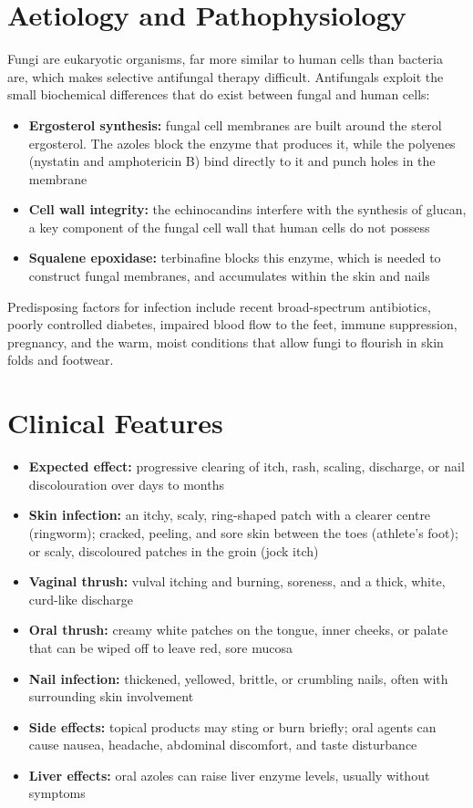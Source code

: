 \section*{Aetiology and Pathophysiology}
Fungi are eukaryotic organisms, far more similar to human cells than bacteria are, which makes selective antifungal therapy difficult. Antifungals exploit the small biochemical differences that do exist between fungal and human cells:

\begin{itemize}
    \item \textbf{Ergosterol synthesis:} fungal cell membranes are built around the sterol ergosterol. The azoles block the enzyme that produces it, while the polyenes (nystatin and amphotericin B) bind directly to it and punch holes in the membrane
    \item \textbf{Cell wall integrity:} the echinocandins interfere with the synthesis of glucan, a key component of the fungal cell wall that human cells do not possess
    \item \textbf{Squalene epoxidase:} terbinafine blocks this enzyme, which is needed to construct fungal membranes, and accumulates within the skin and nails
\end{itemize}

Predisposing factors for infection include recent broad-spectrum antibiotics, poorly controlled diabetes, impaired blood flow to the feet, immune suppression, pregnancy, and the warm, moist conditions that allow fungi to flourish in skin folds and footwear.

\section*{Clinical Features}
\begin{itemize}
    \item \textbf{Expected effect:} progressive clearing of itch, rash, scaling, discharge, or nail discolouration over days to months
    \item \textbf{Skin infection:} an itchy, scaly, ring-shaped patch with a clearer centre (ringworm); cracked, peeling, and sore skin between the toes (athlete's foot); or scaly, discoloured patches in the groin (jock itch)
    \item \textbf{Vaginal thrush:} vulval itching and burning, soreness, and a thick, white, curd-like discharge
    \item \textbf{Oral thrush:} creamy white patches on the tongue, inner cheeks, or palate that can be wiped off to leave red, sore mucosa
    \item \textbf{Nail infection:} thickened, yellowed, brittle, or crumbling nails, often with surrounding skin involvement
    \item \textbf{Side effects:} topical products may sting or burn briefly; oral agents can cause nausea, headache, abdominal discomfort, and taste disturbance
    \item \textbf{Liver effects:} oral azoles can raise liver enzyme levels, usually without symptoms
\end{itemize}

